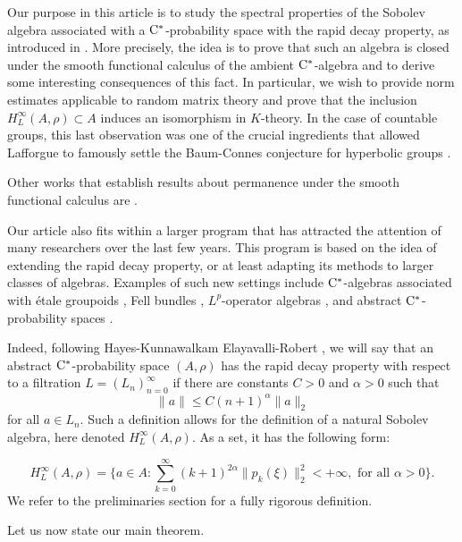 \documentclass[11pt]{article}
\theoremstyle{definition}
\theoremstyle{remark}
\numberwithin{equation}{section}
\numberwithin{equation}{section}
\numberwithin{equation}{section}
\begin{document}
Our purpose in this article is to study the spectral properties of the Sobolev algebra associated with a ${\rm C}^*$-probability space with the rapid decay property, as introduced in \cite{HKER25}. More precisely, the idea is to prove that such an algebra is closed under the smooth functional calculus of the ambient ${\rm C}^*$-algebra and to derive some interesting consequences of this fact. In particular, we wish to provide norm estimates applicable to random matrix theory and prove that the inclusion $H_L^{\infty}(A,\rho)\subset A$ induces an isomorphism in $K$-theory. In the case of countable groups, this last observation was one of the crucial ingredients that allowed Lafforgue to famously settle the Baum-Connes conjecture for hyperbolic groups \cite{La02}. 

Other works that establish results about permanence under the smooth functional calculus are \cite{MB79,BaElJo84,BC91,KiSh94,Fl25a,Fl25b}.

Our article also fits within a larger program that has attracted the attention of many researchers over the last few years. This program is based on the idea of extending the rapid decay property, or at least adapting its methods to larger classes of algebras. Examples of such new settings include ${\rm C}^*$-algebras associated with \'etale groupoids \cite{Ho17}, Fell bundles \cite{BuKa26}, $L^p$-operator algebras \cite{LiYu17,AOP25}, and abstract ${\rm C}^*$-probability spaces \cite{HKER25}. 

Indeed, following Hayes-Kunnawalkam Elayavalli-Robert \cite{HKER25}, we will say that an abstract ${\rm C}^*$-probability space $(A,\rho)$ has the rapid decay property with respect to a filtration $L=(L_{n})_{n=0}^{\infty}$ if there are constants $C>0$ and $\alpha>0$ such that 
    \[
    \|a\|\leq C(n+1)^{\alpha}\|a\|_{2}
    \]
    for all $a\in L_{n}$. Such a definition allows for the definition of a natural Sobolev algebra, here denoted $H_L^{\infty}(A,\rho)$. As a set, it has the following form: 

    $$
    H_L^{\infty}(A,\rho)=\big\{a\in A:\sum_{k=0}^{\infty}(k+1)^{2\alpha}\|p_{k}(\xi)\|_{2}^{2}<+\infty, \text{ for all }\alpha> 0\big\}.
    $$
We refer to the preliminaries section for a fully rigorous definition.

Let us now state our main theorem.
\end{document}
